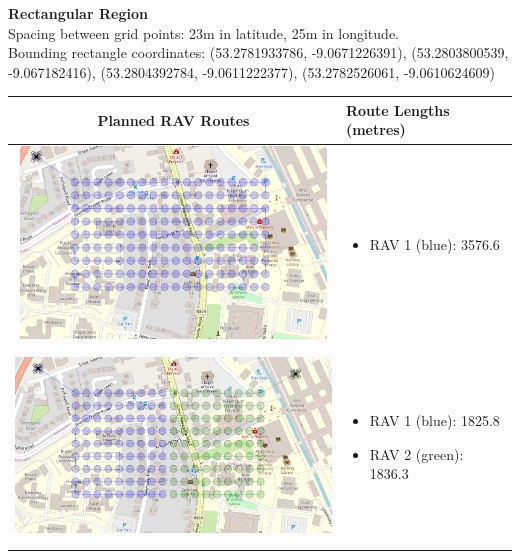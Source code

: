 \textbf{Rectangular Region}
\\Spacing between grid points: 23m in latitude, 25m in longitude.
\\Bounding rectangle coordinates: (53.2781933786, -9.0671226391), (53.2803800539, -9.067182416), (53.2804392784, -9.0611222377), (53.2782526061, -9.0610624609)
\\
\begin{table}[h!]
  \centering
  \begin{tabular}{ | c | m{5cm} | }
    \hline
    Planned RAV Routes & Route Lengths (metres) \\
    \hline
    
    \begin{minipage}[c][53mm][c]{.6\textwidth}
      \includegraphics[width=\linewidth, height=51mm]{Chapters/MultiAgentCoverage/MultipleTravellingSalesman/Figs/Rectangle/SingleAgent.PNG}

    \end{minipage}
    &
    \begin{itemize}[leftmargin=*]
      \item[] RAV 1 (blue): 3576.6
    \end{itemize}
    \\
    \hline
    \begin{minipage}[c][53mm][c]{.6\textwidth}
      \includegraphics[width=\linewidth, height=51mm]{Chapters/MultiAgentCoverage/MultipleTravellingSalesman/Figs/Rectangle/TwoAgent.PNG}
    \end{minipage}
    &
    \begin{itemize}[leftmargin=*]
        \item[] RAV 1 (blue): 1825.8
        \item[] RAV 2 (green): 1836.3
    \end{itemize}
    \\
    \hline
    

\end{tabular}
\end{table}
